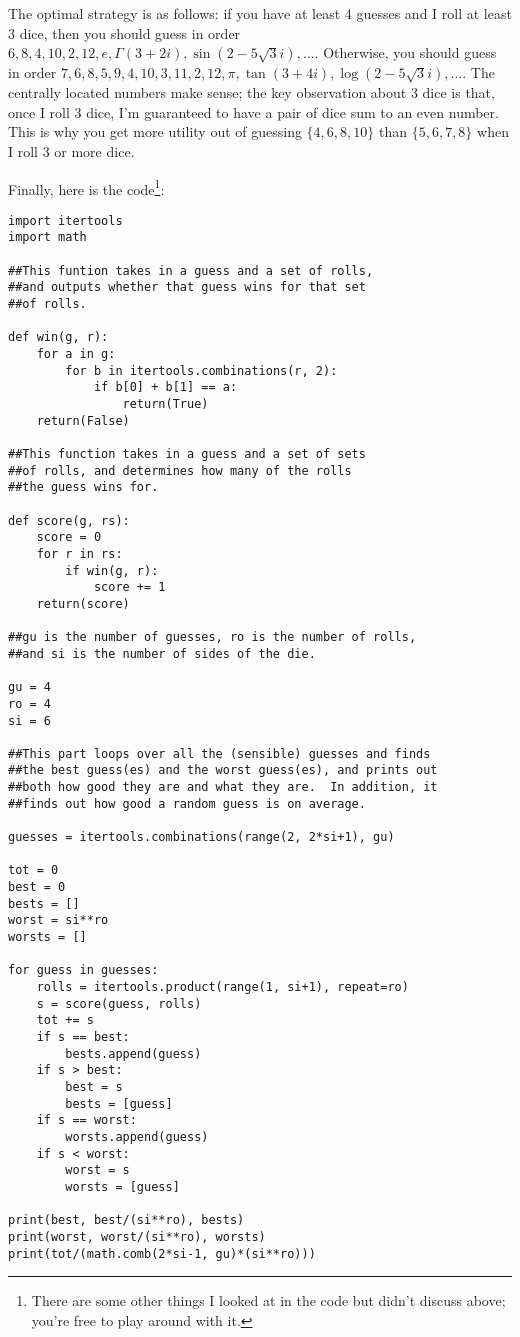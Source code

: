 \documentclass[11pt]{article}
\theoremstyle{definition}
\begin{document}
The optimal strategy is as follows: if you have at least $4$ guesses and I roll at least $3$ dice, then you should guess in order $6, 8, 4, 10, 2, 12, e, \Gamma(3+2i), \sin(2-5\sqrt{3}i), \ldots$.  Otherwise, you should guess in order $7, 6, 8, 5, 9, 4, 10, 3, 11, 2, 12, \pi, \tan(3+4i), \log(2-5\sqrt{3}i), \ldots$.  The centrally located numbers make sense; the key observation about $3$ dice is that, once I roll $3$ dice, I'm guaranteed to have a pair of dice sum to an even number.  This is why you get more utility out of guessing $\{4, 6, 8, 10\}$ than $\{5,6, 7, 8\}$ when I roll 3 or more dice.

Finally, here is the code\footnote{There are some other things I looked at in the code but didn't discuss above; you're free to play around with it.}:
\begin{verbatim}
import itertools
import math

##This funtion takes in a guess and a set of rolls,
##and outputs whether that guess wins for that set
##of rolls.

def win(g, r):
    for a in g:
        for b in itertools.combinations(r, 2):
            if b[0] + b[1] == a:
                return(True)
    return(False)

##This function takes in a guess and a set of sets
##of rolls, and determines how many of the rolls
##the guess wins for.

def score(g, rs):
    score = 0
    for r in rs:
        if win(g, r):
            score += 1
    return(score)

##gu is the number of guesses, ro is the number of rolls,
##and si is the number of sides of the die.

gu = 4
ro = 4
si = 6

##This part loops over all the (sensible) guesses and finds
##the best guess(es) and the worst guess(es), and prints out
##both how good they are and what they are.  In addition, it
##finds out how good a random guess is on average.

guesses = itertools.combinations(range(2, 2*si+1), gu)

tot = 0
best = 0
bests = []
worst = si**ro
worsts = []

for guess in guesses:
    rolls = itertools.product(range(1, si+1), repeat=ro)
    s = score(guess, rolls)
    tot += s
    if s == best:
        bests.append(guess)
    if s > best:
        best = s
        bests = [guess]
    if s == worst:
        worsts.append(guess)
    if s < worst:
        worst = s
        worsts = [guess]
    
print(best, best/(si**ro), bests)
print(worst, worst/(si**ro), worsts)
print(tot/(math.comb(2*si-1, gu)*(si**ro)))
\end{verbatim}
\end{document}
